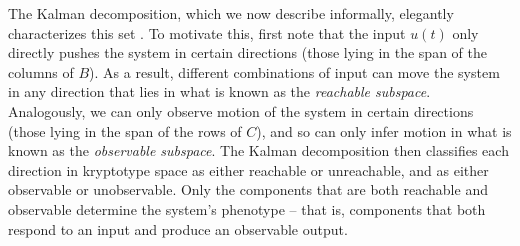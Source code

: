 \documentclass{article}
\newcommand{\1}{\mathbbm{1}}
\begin{document}
The Kalman decomposition, which we now describe informally, elegantly characterizes this set
\citep{kalman1963mathematical,kalman1969topics,anderson1966equivalence}.
To motivate this, first note that the input $u(t)$ only directly pushes the system
in certain directions (those lying in the span of the columns of $B$).
As a result, different combinations of input can 
move the system in any direction that lies in what is known as the \emph{reachable subspace}.
Analogously, we can only observe motion of the system in certain directions
(those lying in the span of the rows of $C$),
and so can only infer motion in what is known as the \emph{observable subspace}.
The Kalman decomposition then classifies each direction in kryptotype space
as either reachable or unreachable, and as either observable or unobservable.
Only the components that are both reachable and observable determine the system's phenotype --
that is, components that both respond to an input and produce an observable output. 
\end{document}
